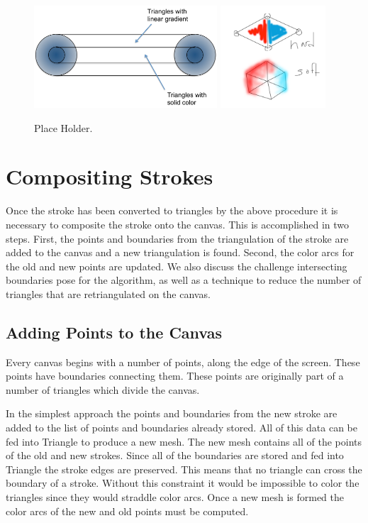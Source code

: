 \documentclass[conference]{acmsiggraph}
\begin{document}
\begin{figure}
    \centering
        \includegraphics[height=1.5in]{images/softstroke}
        \includegraphics[height=1.5in]{images/hardvssoft}
    \caption{Place Holder.}
\end{figure}

\section{Compositing Strokes}
Once the stroke has been converted to triangles by the above procedure it is necessary to
composite the stroke onto the canvas. This is accomplished in two steps. First, the points
and boundaries from the triangulation of the stroke are added to the canvas and a new
triangulation is found. Second, the color arcs for the old and new points are updated.
We also discuss the challenge intersecting boundaries pose for the algorithm, as well
as a technique to reduce the number of triangles that are retriangulated on the canvas.


\subsection{Adding Points to the Canvas}

Every canvas begins with a number of points, along the edge of the screen. These
points have boundaries connecting them. These points are originally part of a number of triangles which
divide the canvas.

In the simplest approach the points and boundaries from the new stroke are added
to the list of points and boundaries already stored. All of this data can be fed into Triangle
to produce a new mesh. The new mesh contains all of the points of the old and new strokes. Since
all of the boundaries are stored and fed into Triangle the stroke edges are preserved. This means that
no triangle can cross the boundary of a stroke. Without this constraint it would be impossible to color the
triangles since they would straddle color arcs. Once a new mesh is formed the color arcs of the 
new and old points must be computed.
\end{document}
